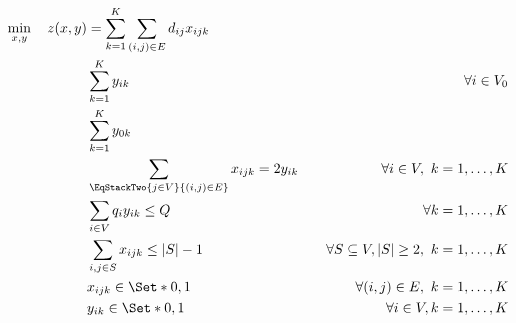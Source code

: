 \begin{align}
	\min_{x, y} \quad z(x, y) & =  \sum_{k = 1}^K \sum_{(i, j) \in E} d_{ij} x_{ijk} \label{eq:three-index-flow-obj-func}                                                                                                                          \\
	                          & \sum_{k = 1}^K y_{ik}                                                                     & \quad \forall i \in V_0                                              \label{eq:three-index-flow-all-customers-visited} \\
	                          & \sum_{k = 1}^K y_{0k}                                                                     & \label{eq:three-index-flow-tour-starts-and-ends-at-depot}                                                              \\
	                          & \sum_{\EqStackTwo{j \in V}{(i, j) \in E}} x_{ijk} = 2 y_{ik}                              & \quad \forall i \in V,\ k = 1, \dots, K \label{eq:three-index-flow-force-visited-customer-if-flow}                     \\
	                          & \sum_{i \in V} q_i y_{ik} \le Q                                                           & \quad \forall k = 1, \dots, K \label{eq:three-index-flow-force-resource-upper-bound}                                   \\
	                          & \sum_{i, j \in S} x_{ijk} \le |S| - 1                                                     & \quad \forall S \subseteq V, |S| \ge 2,\ k = 1, \dots, K \label{eq:three-index-flow-secs}                              \\
	                          & x_{ijk}                   \in \Set*{0, 1}                                                 & \quad \forall (i, j) \in E,\ k = 1, \dots, K             \label{eq:three-index-flow-x-mip-var-bounds}                  \\
	                          & y_{ik}                    \in \Set*{0, 1}                                                 & \quad \forall i \in V,k = 1, \dots, K  \label{eq:three-index-flow-y-mip-var-bounds}
\end{align}

